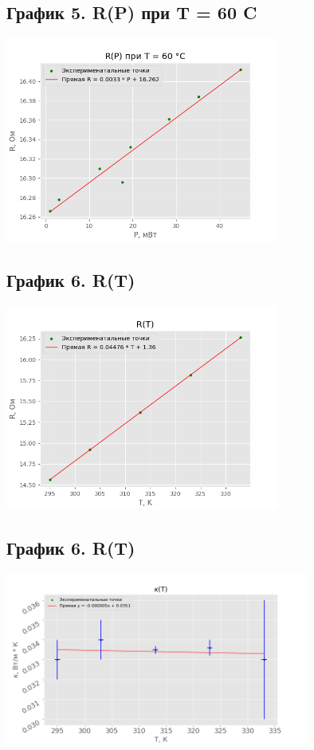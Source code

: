 \documentclass[15pt,a5paper,reqno]{article}
\begin{document}
    \newpage
    \subsection{График 5. R(P) при T = 60 \degree C}
    \begin{center}
        \centering
        \includegraphics[width = 9cm]{60.png}
    \end{center}
    
    \subsection{График 6. R(T)}
    \begin{center}
        \centering
        \includegraphics[width = 9cm]{График 6.png}
    \end{center}
    
    \subsection{График 6. R(T)}
    \begin{center}
        \centering
        \includegraphics[width = 10cm]{График 7.png}
    \end{center}
\end{document}
